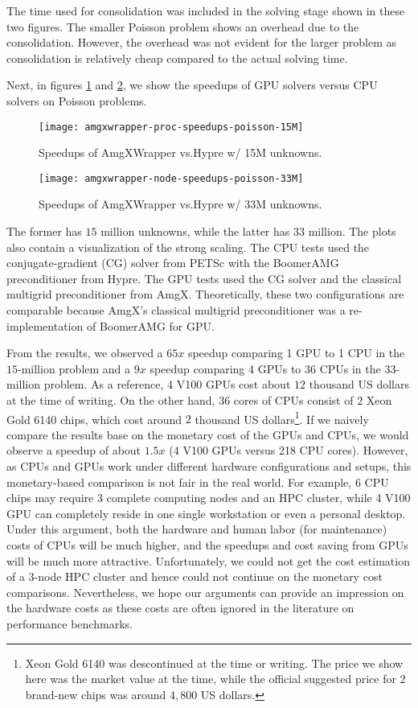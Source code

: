 The time used for consolidation was included in the solving stage shown in these two figures.
The smaller Poisson problem shows an overhead due to the consolidation.
However, the overhead was not evident for the larger problem as consolidation is relatively cheap compared to the actual solving time. 

Next, in figures \ref{fig:amgxwrapper-speedups-15M} and \ref{fig:amgxwrapper-speedups-33M}, we show the speedups of GPU solvers versus CPU solvers on Poisson problems.
\begin{figure}[hbt!]
    \texttt{[image: amgxwrapper-proc-speedups-poisson-15M]}
    \caption{Speedups of AmgXWrapper vs.\@ Hypre w/ 15M unknowns.}
    \label{fig:amgxwrapper-speedups-15M}
\end{figure}
\begin{figure}[hbt!]
    \texttt{[image: amgxwrapper-node-speedups-poisson-33M]}
    \caption{Speedups of AmgXWrapper vs.\@ Hypre w/ 33M unknowns.}
    \label{fig:amgxwrapper-speedups-33M}
\end{figure}
The former has $15$ million unknowns, while the latter has $33$ million.
The plots also contain a visualization of the strong scaling.
The CPU tests used the conjugate-gradient (CG) solver from PETSc with the BoomerAMG preconditioner from Hypre.
The GPU tests used the CG solver and the classical multigrid preconditioner from AmgX.
Theoretically, these two configurations are comparable because AmgX's classical multigrid preconditioner was a re-implementation of BoomerAMG for GPU.

From the results, we observed a $65x$ speedup comparing 1 GPU to 1 CPU in the $15$-million problem and a $9x$ speedup comparing 4 GPUs to 36 CPUs in the $33$-million problem.
As a reference, 4 V100 GPUs cost about $12$ thousand US dollars at the time of writing.
On the other hand, $36$ cores of CPUs consist of $2$ Xeon Gold 6140 chips, which cost around $2$ thousand US dollars\footnote{Xeon Gold 6140 was descontinued at the time or writing. The price we show here was the market value at the time, while the official suggested price for $2$ brand-new chips was around $4,800$ US dollars.}.
If we naively compare the results base on the monetary cost of the GPUs and CPUs, we would observe a speedup of about $1.5x$ (4 V100 GPUs versus 218 CPU cores).
However, as CPUs and GPUs work under different hardware configurations and setups, this monetary-based comparison is not fair in the real world.
For example, $6$ CPU chips may require $3$ complete computing nodes and an HPC cluster, while 4 V100 GPU can completely reside in one single workstation or even a personal desktop.
Under this argument, both the hardware and human labor (for maintenance) costs of CPUs will be much higher, and the speedups and cost saving from GPUs will be much more attractive.
Unfortunately, we could not get the cost estimation of a 3-node HPC cluster and hence could not continue on the monetary cost comparisons.
Nevertheless, we hope our arguments can provide an impression on the hardware costs as these costs are often ignored in the literature on performance benchmarks.


